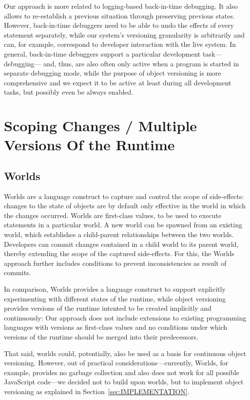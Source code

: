 Our approach is more related to logging-based back-in-time debugging.
It also allows to re-establish a previous situation through preserving previous states.
However, back-in-time debuggers need to be able to undo the effects of every statement separately, while our system's versioning granularity is arbitrarily and can, for example, correspond to developer interaction with the live system.
In general, back-in-time debuggers support a particular development task---debugging--- and, thus, are also often only active when a program is started in separate debugging mode, while the purpose of object versioning is more comprehensive and we expect it to be active at least during all development tasks, but possibly even be always enabled.


\section{Scoping Changes / Multiple Versions Of the Runtime}


\subsection{Worlds}

Worlds are a language construct to capture and control the scope of side-effects: changes to the state of objects are by default only effective in the world in which the changes occurred.
Worlds are first-class values, to be used to execute statements in a particular world.
A new world can be spawned from an existing world, which establishes a child-parent relationships between the two worlds.
Developers can commit changes contained in a child world to its parent world, thereby extending the scope of the captured side-effects.
For this, the Worlds approach further includes conditions to prevent inconsistencies as result of commits.

In comparison, Worlds provides a language construct to support explicitly experimenting with different states of the runtime, while object versioning provides versions of the runtime intented to be created implicitly and continuously: Our approach does not include extensions to existing programming languages with versions as first-class values and no conditions under which versions of the runtime should be merged into their predecessors.

That said, worlds could, potentially, also be used as a basis for continuous object versioning.
However, out of practical considerations---currently, Worlds, for example, provides no garbage collection and also does not work for all possible JavaScript code---we decided not to build upon worlds, but to implement object versioning as explained in Section~\ref{sec:IMPLEMENTATION}.


